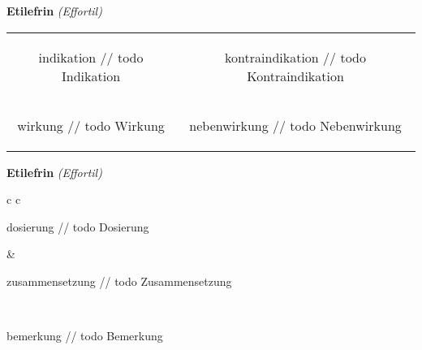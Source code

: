 \documentclass[12pt]{beamer}
\begin{document}
\begin{frame}{
    \textbf{Etilefrin}
    \textit{(Effortil)}
}
    \begin{tabular}{c c}
        \begin{beamercolorbox}[wd=\boxwidth\textwidth,ht=\boxheight\textheight,sep=1em]{indikation}
        // todo Indikation
        \end{beamercolorbox} & 
        \begin{beamercolorbox}[wd=\boxwidth\textwidth,ht=\boxheight\textheight,sep=1em]{kontraindikation}
        // todo Kontraindikation 
        \end{beamercolorbox} \\
        \begin{beamercolorbox}[wd=\boxwidth\textwidth,ht=\boxheight\textheight,sep=1em]{wirkung}
        // todo Wirkung
        \end{beamercolorbox} & 
        \begin{beamercolorbox}[wd=\boxwidth\textwidth,ht=\boxheight\textheight,sep=1em]{nebenwirkung}
        // todo Nebenwirkung
        \end{beamercolorbox} \\
    \end{tabular}
\end{frame}

\begin{frame}{
    \textbf{Etilefrin}
    \textit{(Effortil)}
}
    \begin{tabular}{c c}
        \begin{beamercolorbox}[wd=\boxwidth\textwidth,ht=\boxheight\textheight,sep=1em]{dosierung}
        // todo Dosierung
        \end{beamercolorbox} & 
        \begin{beamercolorbox}[wd=\boxwidth\textwidth,ht=\boxheight\textheight,sep=1em]{zusammensetzung}
        // todo Zusammensetzung
        \end{beamercolorbox} \\
        \begin{beamercolorbox}[wd=\textwidth,ht=\boxheight\textheight,sep=1em]{bemerkung}
        // todo Bemerkung
        \end{beamercolorbox} \\
    \end{tabular}
\end{frame}
\end{document}
